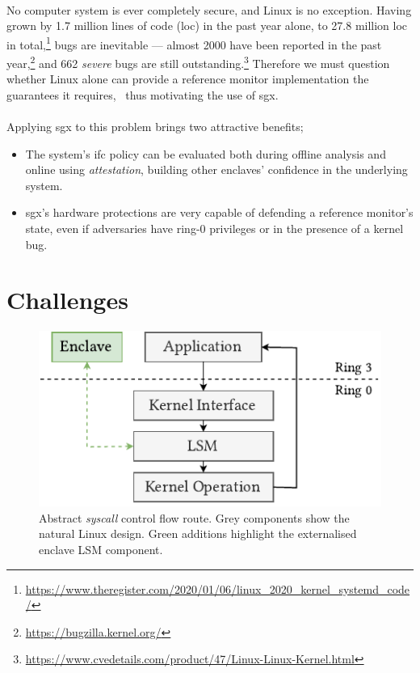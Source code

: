\paragraph{} No computer system is ever completely secure, and Linux is no exception. Having grown by 1.7 million lines of code (\acrshort{loc}) in the past year alone, to 27.8 million \acrshort{loc} in total,\footnote{\url{https://www.theregister.com/2020/01/06/linux\_2020\_kernel\_systemd\_code/}} bugs are inevitable --- almost 2000 have been reported in the past year,\footnote{\url{https://bugzilla.kernel.org/}} and 662 \textit{severe} bugs are still outstanding.\footnote{\url{https://www.cvedetails.com/product/47/Linux-Linux-Kernel.html}} Therefore we must question whether Linux alone can provide a reference monitor implementation the guarantees it requires,~\cite{Lipp2018MeltdownRK, 10.5555/2831143.2831164} thus motivating the use of \acrshort{sgx}.

\paragraph{} Applying \acrshort{sgx} to this problem brings two attractive benefits;
\begin{itemize}
    \item The system's \acrshort{ifc} policy can be evaluated both during offline analysis and online using \textit{attestation}, building other enclaves' confidence in the underlying system.
    \item \acrshort{sgx}'s hardware protections are very capable of defending a reference monitor's state, even if adversaries have ring-0 privileges or in the presence of a kernel bug.
\end{itemize}

\section{Challenges}
\label{sec:challenges}

\begin{figure}[]
    \centering
    \includegraphics[width=0.48\linewidth]{figures/SGX-EnclaveIntegration.pdf}
    \caption[Abstract \textit{syscall} control flow route for enclave integration.]{Abstract \textit{syscall} control flow route. Grey components show the natural Linux design. Green additions highlight the externalised enclave LSM component.}
    \vspace{5mm}
    \label{fig:sgx-abstract-integration}
\end{figure}

